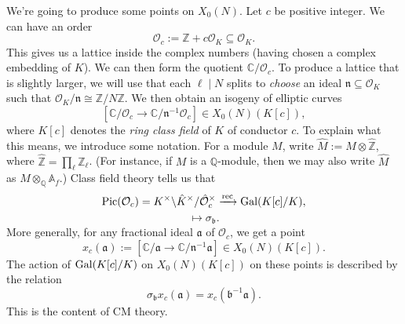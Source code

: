 \documentclass[reqno]{amsart} 
\begin{document}
We're going to produce some points on $X_0(N)$.  Let $c$ be positive integer.  We can have an order
\begin{equation*}
  \mathcal{O}_c := \mathbb{Z} + c \mathcal{O}_K \subseteq \mathcal{O}_K.
\end{equation*}
This gives us a lattice inside the complex numbers (having chosen a complex embedding of $K$).  We can then form the quotient $\mathbb{C} / \mathcal{O}_c$.  To produce a lattice that is slightly larger, we will use that each $\ell \mid N$ splits to \emph{choose} an ideal $\mathfrak{n} \subseteq \mathcal{O}_K$ such that $\mathcal{O}_K / \mathfrak{n} \cong \mathbb{Z} / N \mathbb{Z}$.  We then obtain an isogeny of elliptic curves
\begin{equation*}
  \left[ \mathbb{C} / \mathcal{O}_c \rightarrow \mathbb{C} / \mathfrak{n}^{-1} \mathcal{O}_c \right] \in X_0(N)(K[c]),
\end{equation*}
where $K[c]$ denotes the \emph{ring class field} of $K$ of conductor $c$.  To explain what this means, we introduce some notation.  For a module $M$, write $\hat{M} := M \otimes \hat{\mathbb{Z}}$, where $\hat{\mathbb{Z}} = \prod_{\ell} \mathbb{Z}_{\ell}$.  (For instance, if $M$ is a $\mathbb{Q}$-module, then we may also write $\hat{M}$ as $M \otimes_{\mathbb{Q}} \mathbb{A}_f$.)  Class field theory tells us that
\begin{equation*}
  \operatorname{Pic}(\mathcal{O}_c) = K^\times \backslash \hat{K}^\times / \hat{\mathcal{O}}_c^\times \xrightarrow{\mathrm{rec}} \operatorname{Gal}(K[c] / K),
\end{equation*}
\begin{equation*}
  [\mathfrak{b}] \mapsto \sigma_{\mathfrak{b}}.
\end{equation*}
More generally, for any fractional ideal $\mathfrak{a}$ of $\mathcal{O}_c$, we get a point
\begin{equation*}
  x_{c}(\mathfrak{a}) := \left[ \mathbb{C} / \mathfrak{a} \rightarrow \mathbb{C} / \mathfrak{n}^{-1} \mathfrak{a} \right] \in X_0(N)(K[c]).
\end{equation*}
The action of $\operatorname{Gal}(K[c] / K)$ on $X_0(N)(K[c])$ on these points is described by the relation
\begin{equation}\label{eq:cq6sjz7g2n}
  \sigma_{\mathfrak{b}} x_c(\mathfrak{a}) = x_c(\mathfrak{b}^{-1} \mathfrak{a}).
\end{equation}
This is the content of CM theory.
\end{document}
